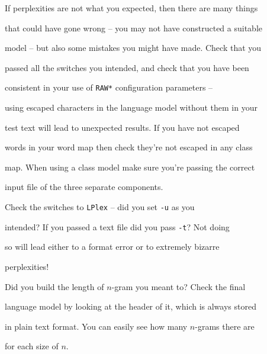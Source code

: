 

If perplexities are not what you expected, then there are many things


that could have gone wrong -- you may not have constructed a suitable


model -- but also some mistakes you might have made.  Check that you


passed all the switches you intended, and check that you have been


consistent in your use of {\tt *RAW*} configuration parameters --


using escaped characters in the language model without them in your


test text will lead to unexpected results.  If you have not escaped


words in your word map then check they're not escaped in any class


map.  When using a class model make sure you're passing the correct


input file of the three separate components.





Check the switches to {\tt LPlex} -- did you set {\tt -u} as you


intended?  If you passed a text file did you pass {\tt -t}?  Not doing


so will lead either to a format error or to extremely bizarre


perplexities!





Did you build the length of $n$-gram you meant to?  Check the final


language model by looking at the header of it, which is always stored


in plain text format.  You can easily see how many $n$-grams there are


for each size of $n$.


